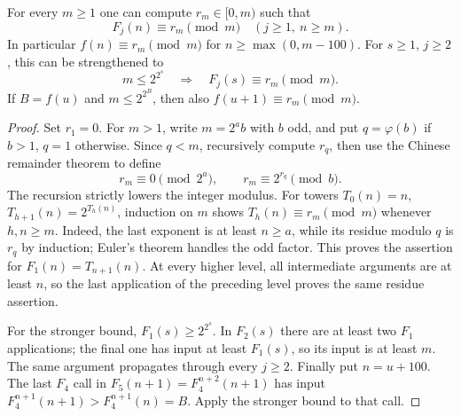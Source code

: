 \begin{lemma}\label{m:lem:residues}
For every $m\ge1$ one can compute $r_m\in[0,m)$ such that
\[
 F_j(n)\equiv r_m\pmod m\quad(j\ge1,\ n\ge m).
\]
In particular $f(n)\equiv r_m\pmod m$ for $n\ge\max(0,m-100)$.
For $s\ge1$, $j\ge2$, this can be strengthened to
\begin{equation}\label{m:eq:envelope}
 m\le 2^{2^s}\quad\Longrightarrow\quad F_j(s)\equiv r_m\pmod m.
\end{equation}
If $B=f(u)$ and $m\le2^{2^B}$, then also $f(u+1)\equiv r_m\pmod m$.
\end{lemma}
\begin{proof}
Set $r_1=0$. For $m>1$, write $m=2^a b$ with $b$ odd, and put
$q=\varphi(b)$ if $b>1$, $q=1$ otherwise. Since $q<m$, recursively
compute $r_q$, then use the Chinese remainder theorem to define
\[
 r_m\equiv0\pmod{2^a},\qquad r_m\equiv2^{r_q}\pmod b.
\]
The recursion strictly lowers the integer modulus.
For towers $T_0(n)=n$, $T_{h+1}(n)=2^{T_h(n)}$, induction on $m$ shows
$T_h(n)\equiv r_m\pmod m$ whenever $h,n\ge m$. Indeed, the last exponent
is at least $n\ge a$, while its residue modulo $q$ is $r_q$ by induction;
Euler's theorem handles the odd factor. This proves the assertion for
$F_1(n)=T_{n+1}(n)$. At every higher level, all intermediate arguments are
at least $n$, so the last application of the preceding level proves the
same residue assertion.

For the stronger bound, $F_1(s)\ge2^{2^s}$. In $F_2(s)$ there are at
least two $F_1$ applications; the final one has input at least $F_1(s)$,
so its input is at least $m$. The same argument propagates through every
$j\ge2$. Finally put $n=u+100$. The last $F_4$ call in
$F_5(n+1)=F_4^{n+2}(n+1)$ has input
$F_4^{n+1}(n+1)>F_4^{n+1}(n)=B$. Apply the stronger bound to that call.
\end{proof}

